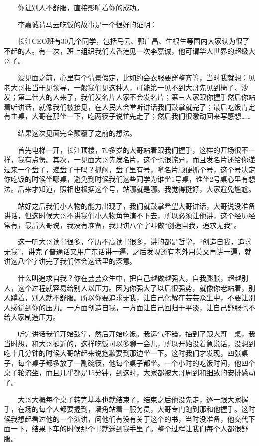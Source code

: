 \documentclass[11pt]{ctexart}
\begin{document}
　　你让别人不舒服，直接影响着你的成功。

　　李嘉诚请马云吃饭的故事是一个很好的证明：

　　长江CEO班有30几个同学，包括马云、郭广昌、牛根生等国内大家认为很了不起的人。有一次，班上组织我们去香港见一次李嘉诚，他可谓华人世界的超级大哥了。

　　没见面之前，心里有个情景假定，比如约会衣服要穿整齐等，当时我就想：见老大哥相当于见领导，一般我们见这种人，可能第一见不到大哥先见到椅子、沙发；第二伟大的人来了，我们发名片人家不会发名片；第三人家跟你握手然后你站着听讲话，就像我们被接见，在人民大会堂听讲话我们鼓掌就完了；最后吃饭肯定有主桌，大哥在那坐一下，吃两筷子说忙先走了；然后我们很激动回来写感想……

　　结果这次见面完全颠覆了之前的想法。

　　首先电梯一开，长江顶楼，70多岁的大哥站着跟我们握手，这样的开场很不一样，我有点愣。其次，一见面大哥先发名片，这个也很诧异，而且发名片还给你递过来一个盘子，递盘子干吗？抓阄，盘子里有号，拿名片顺便抓个号，这个号决定你吃饭的时候坐哪桌，避免到时候我们这些同学为谁坐1号桌，谁坐2号桌心里有想法。后来才知道，照相也根据这个号，站哪就是哪。我觉得挺好，大家避免尴尬。

　　站好之后我们小人物的能力出现了，我们就鼓掌希望大哥讲话，大哥说没准备讲话，但这时候大哥不讲我们小人物角色演不下去，所以必须让他讲，这个经历经常有，最后大哥说，我没有准备，我只讲八个字叫做“创造自我，追求无我”。

　　这一听大哥读书很多，学历不高读书很多，讲的都是哲学，“创造自我，追求无我”，讲完了普通话又用广东话讲一遍，之后发现还有老外用英文再讲一遍，就讲这八个字讲完了我们体会这话里的深意。

　　什么叫追求自我？你在芸芸众生中，把自己越做越强大，自我膨胀，超越别人，这个过程就容易给别人以压力。因为你强大了以后很强势，就像你老站着，别人蹲着，别人就不舒服。所以你要追求无我，让自己化解在芸芸众生中，不要让别人感觉到你的压力。一方面创造自我，一方面让自己回归于平淡，让自己舒服也不给大家制造压力。

　　听完讲话我们开始鼓掌，然后开始吃饭。我运气不错，抽到了跟大哥一桌，我当时想，和大哥挺近的，这样吃饭可以多聊一会儿，所以开始没着急说话，没想到吃十几分钟的时候大哥站起来说抱歉要到那边坐一下。这时我们才发现，四张桌子，每个桌子都多放了一副碗筷，他每个桌子都坐。一个小时的吃饭时间，他四个桌子轮流坐，而且几乎都是15分钟，到这时，大家都被大哥周到和细致的安排感动了。

　　大哥大概每个桌子转完基本也就结束了，结束之后他没先走，逐一跟大家握手，在场的每个人都要握到，墙角站着一服务员，大哥专门跑到那和他握手。这时候我想起看过他的一个演讲，问他们有没有关于这个的书，当时没准备，他交代下面一下，结果下车的时候那个书就送到我手里了。整个过程让我们每个人都很舒服。
\end{document}

